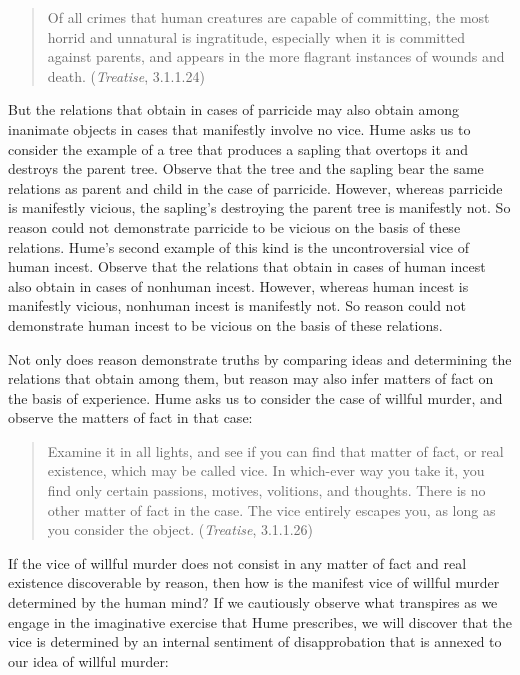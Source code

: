 \begin{quote}
	Of all crimes that human creatures are capable of committing, the most horrid and unnatural is ingratitude, especially when it is committed against parents, and appears in the more flagrant instances of wounds and death. (\emph{Treatise}, 3.1.1.24)
\end{quote}

But the relations that obtain in cases of parricide may also obtain among inanimate objects in cases that manifestly involve no vice. Hume asks us to consider the example of a tree that produces a sapling that overtops it and destroys the parent tree. Observe that the tree and the sapling bear the same relations as parent and child in the case of parricide. However, whereas parricide is manifestly vicious, the sapling's destroying the parent tree is manifestly not. So reason could not demonstrate parricide to be vicious on the basis of these relations. Hume's second example of this kind is the uncontroversial vice of human incest. Observe that the relations that obtain in cases of human incest also obtain in cases of nonhuman incest. However, whereas human incest is manifestly vicious, nonhuman incest is manifestly not. So reason could not demonstrate human incest to be vicious on the basis of these relations.

Not only does reason demonstrate truths by comparing ideas and determining the relations that obtain among them, but reason may also infer matters of fact on the basis of experience. Hume asks us to consider the case of willful murder, and observe the matters of fact in that case:

\begin{quote}
	Examine it in all lights, and see if you can find that matter of fact, or real existence, which may be called vice. In which-ever way you take it, you find only certain passions, motives, volitions, and thoughts. There is no other matter of fact in the case. The vice entirely escapes you, as long as you consider the object. (\emph{Treatise}, 3.1.1.26)
\end{quote}

If the vice of willful murder does not consist in any matter of fact and real existence discoverable by reason, then how is the manifest vice of willful murder determined by the human mind? If we cautiously observe what transpires as we engage in the imaginative exercise that Hume prescribes, we will discover that the vice is determined by an internal sentiment of disapprobation that is annexed to our idea of willful murder:


